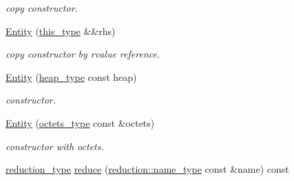 \begin{DoxyCompactItemize}
\begin{DoxyCompactList}\small\item\em copy constructor. \end{DoxyCompactList}\item 
\hypertarget{classhryky_1_1uri_1_1userinfo_1_1_entity_a395e218d19663fd5cf970ff86d35a5ca}{\hyperlink{classhryky_1_1uri_1_1userinfo_1_1_entity_a395e218d19663fd5cf970ff86d35a5ca}{Entity} (\hyperlink{classhryky_1_1uri_1_1userinfo_1_1_entity_ac4680728d50e274ba5073c9d25c42c06}{this\-\_\-type} \&\&rhs)}\label{classhryky_1_1uri_1_1userinfo_1_1_entity_a395e218d19663fd5cf970ff86d35a5ca}

\begin{DoxyCompactList}\small\item\em copy constructor by rvalue reference. \end{DoxyCompactList}\item 
\hypertarget{classhryky_1_1uri_1_1userinfo_1_1_entity_aa70d14808ae104ab3e0375e9ede651b4}{\hyperlink{classhryky_1_1uri_1_1userinfo_1_1_entity_aa70d14808ae104ab3e0375e9ede651b4}{Entity} (\hyperlink{classhryky_1_1memory_1_1heap_1_1_base}{heap\-\_\-type} const heap)}\label{classhryky_1_1uri_1_1userinfo_1_1_entity_aa70d14808ae104ab3e0375e9ede651b4}

\begin{DoxyCompactList}\small\item\em constructor. \end{DoxyCompactList}\item 
\hypertarget{classhryky_1_1uri_1_1userinfo_1_1_entity_a26fb1d6d9d1ac200555cad6ad7ce80a8}{\hyperlink{classhryky_1_1uri_1_1userinfo_1_1_entity_a26fb1d6d9d1ac200555cad6ad7ce80a8}{Entity} (\hyperlink{classhryky_1_1_vector}{octets\-\_\-type} const \&octets)}\label{classhryky_1_1uri_1_1userinfo_1_1_entity_a26fb1d6d9d1ac200555cad6ad7ce80a8}

\begin{DoxyCompactList}\small\item\em constructor with octets. \end{DoxyCompactList}\item 
\hypertarget{classhryky_1_1uri_1_1userinfo_1_1_entity_a610386797cb5fe4ece29b5ea688cbede}{\hyperlink{namespacehryky_a343a9a4c36a586be5c2693156200eadc}{reduction\-\_\-type} \hyperlink{classhryky_1_1uri_1_1userinfo_1_1_entity_a610386797cb5fe4ece29b5ea688cbede}{reduce} (\hyperlink{namespacehryky_1_1reduction_ac686c30a4c8d196bbd0f05629a6b921f}{reduction\-::name\-\_\-type} const \&name) const }\label{classhryky_1_1uri_1_1userinfo_1_1_entity_a610386797cb5fe4ece29b5ea688cbede}


\end{DoxyCompactItemize}
